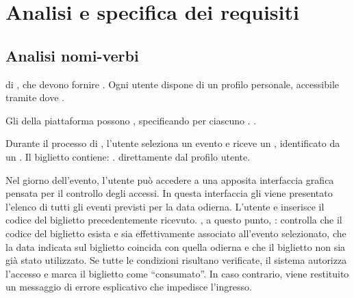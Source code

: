 
\chapter{Analisi e specifica dei requisiti}
\section{Analisi nomi-verbi}


 di , che devono fornire . Ogni utente dispone di un profilo personale, accessibile tramite  dove .

Gli  della piattaforma possono , specificando per ciascuno .   .

Durante il processo di , l’utente seleziona un evento e riceve un , identificato da un . Il biglietto contiene: .  direttamente dal profilo utente.

Nel giorno dell’evento, l’utente pu\`{o} accedere a una apposita interfaccia grafica pensata per il controllo degli accessi. In questa interfaccia gli viene presentato l’elenco di tutti gli eventi previsti per la data odierna. L’utente  e inserisce il codice del biglietto precedentemente ricevuto. , a questo punto, : controlla che il codice del biglietto esista e sia effettivamente associato all’evento selezionato, che la data indicata sul biglietto coincida con quella odierna e che il biglietto non sia gi\`{a} stato utilizzato. Se tutte le condizioni risultano verificate, il sistema autorizza l’accesso e marca il biglietto come “consumato”. In caso contrario, viene restituito un messaggio di errore esplicativo che impedisce l’ingresso.

